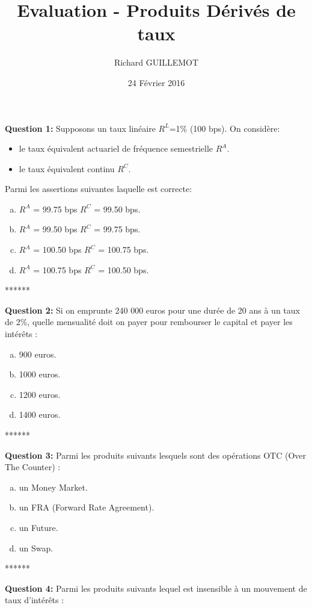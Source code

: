 \documentclass{article}
\newcommand{\indentitem}{\setlength\itemindent{25pt}}
\begin{document}
\title{Evaluation - Produits Dérivés de taux}
\date{24 Février 2016}
\author{Richard GUILLEMOT}
\maketitle

\textbf{Question 1:} Supposons un taux linéaire $R^L$=1\% (100 bps). On considère: 
\begin{itemize}
	\indentitem \item le taux équivalent actuariel de fréquence semestrielle $R^A$.
	\indentitem \item le taux équivalent continu $R^C$.
\end{itemize}
\vspace{0.2cm}
Parmi les assertions suivantes laquelle est correcte:
\begin{enumerate}[a)]
\indentitem \item $R^A$ = 99.75 bps $R^C$ = 99.50 bps.
\indentitem \item $R^A$ = 99.50 bps $R^C$ = 99.75 bps.
\indentitem \item $R^A$ = 100.50 bps $R^C$ = 100.75 bps.
\indentitem \item $R^A$ = 100.75 bps $R^C$ = 100.50 bps.
\end{enumerate}
\smallskip
\centerline{******}
\smallskip
\textbf{Question 2:}
Si on emprunte 240 000 euros pour une durée de 20 ans à un taux de 2\%, quelle mensualité doit on payer pour rembourser le capital et payer les intérêts :
\begin{enumerate}[a)]
\indentitem \item 900 euros.
\indentitem \item 1000 euros.
\indentitem \item 1200 euros.
\indentitem \item 1400 euros.
\end{enumerate}
\smallskip
\centerline{******}
\smallskip
\textbf{Question 3:}
Parmi les produits suivants lesquels sont des opérations OTC (Over The Counter) :
\begin{enumerate}[a)]
\indentitem \item un Money Market.
\indentitem \item un FRA (Forward Rate Agreement).
\indentitem \item un Future.
\indentitem \item un Swap.
\end{enumerate}
\newpage
\smallskip
\centerline{******}
\smallskip
\textbf{Question 4:}
Parmi les produits suivants lequel est insensible à un mouvement de taux d’intérêts :
\end{document}
